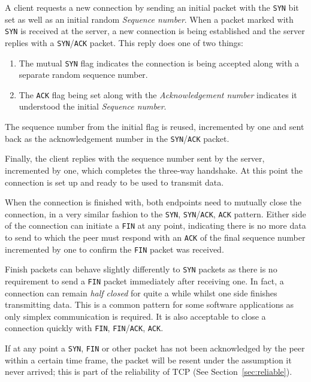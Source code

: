 \documentclass[11pt,a4paper,british]{bhamarticle}
\begin{document}
\begin{multicols}{2}
A client requests a new connection by sending an initial packet with the \texttt{SYN} bit set as well as an initial random \textit{Sequence number}. When a packet marked with \texttt{SYN} is received at the server, a new connection is being established and the server replies with a \texttt{SYN}/\texttt{ACK} packet. This reply does one of two things:
\begin{enumerate}
    \item The mutual \texttt{SYN} flag indicates the connection is being accepted along with a separate random sequence number.
    \item The \texttt{ACK} flag being set along with the \textit{Acknowledgement number} indicates it understood the initial \textit{Sequence number}.
\end{enumerate}
The sequence number from the initial flag is reused, incremented by one and sent back as the acknowledgement number in the \texttt{SYN}/\texttt{ACK} packet.

Finally, the client replies with the sequence number sent by the server, incremented by one, which completes the three-way handshake. At this point the connection is set up and ready to be used to transmit data.

When the connection is finished with, both endpoints need to mutually close the connection, in a very similar fashion to the \texttt{SYN}, \texttt{SYN}/\texttt{ACK}, \texttt{ACK} pattern.
Either side of the connection can initiate a \texttt{FIN} at any point, indicating there is no more data to send to which the peer must respond with an \texttt{ACK} of the final sequence number incremented by one to confirm the \texttt{FIN} packet was received.

Finish packets can behave slightly differently to \texttt{SYN} packets as there is no requirement to send a \texttt{FIN} packet immediately after receiving one. In fact, a connection can remain \textit{half closed} for quite a while whilst one side finishes transmitting data. This is a common pattern for some software applications as only simplex communication is required. It is also acceptable to close a connection quickly with \texttt{FIN}, \texttt{FIN}/\texttt{ACK}, \texttt{ACK}.

If at any point a \texttt{SYN}, \texttt{FIN} or other packet has not been acknowledged by the peer within a certain time frame, the packet will be resent under the assumption it never arrived; this is part of the reliability of TCP (See Section~\ref{sec:reliable}).


\end{multicols}
\end{document}
